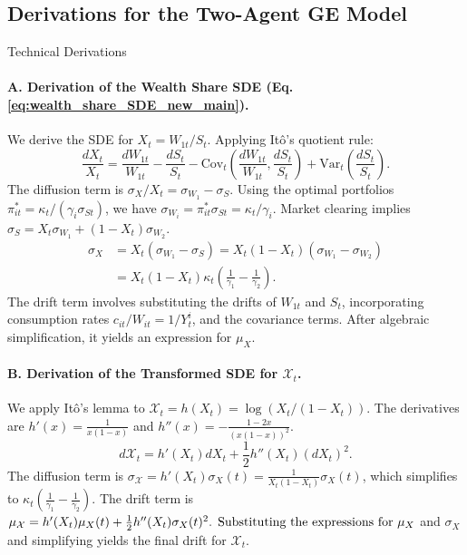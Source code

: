\subsection{Derivations for the Two-Agent GE Model}
\label{app:WealthShare}
\begin{leanproofbox}{Technical Derivations}
\paragraph{A. Derivation of the Wealth Share SDE (Eq. \ref{eq:wealth_share_SDE_new_main}).}
We derive the SDE for \(X_t = W_{1t}/S_t\). Applying Itô's quotient rule:
\begin{equation*}
\frac{dX_t}{X_t} = \frac{dW_{1t}}{W_{1t}} - \frac{dS_t}{S_t} - \text{Cov}_t\left(\frac{dW_{1t}}{W_{1t}}, \frac{dS_t}{S_t}\right) + \text{Var}_t\left(\frac{dS_t}{S_t}\right).
\end{equation*}
The diffusion term is \(\sigma_X/X_t = \sigma_{W_1} - \sigma_S\). Using the optimal portfolios \(\pi_{it}^* = \kappa_t/(\gamma_i \sigma_{St})\), we have \(\sigma_{W_i} = \pi_{it}^*\sigma_{St} = \kappa_t/\gamma_i\). Market clearing implies \(\sigma_S = X_t \sigma_{W_1} + (1-X_t)\sigma_{W_2}\).
\begin{align*}
\sigma_X &= X_t(\sigma_{W_1} - \sigma_S) = X_t(1-X_t)(\sigma_{W_1}-\sigma_{W_2}) \\
&= X_t(1-X_t)\kappa_t\left(\frac{1}{\gamma_1}-\frac{1}{\gamma_2}\right).
\end{align*}
The drift term involves substituting the drifts of \(W_{1t}\) and \(S_t\), incorporating consumption rates \(c_{it}/W_{it} = 1/Y^i_t\), and the covariance terms. After algebraic simplification, it yields an expression for $\mu_X$.

\paragraph{B. Derivation of the Transformed SDE for \(\mathcal{X}_t\).}
We apply Itô's lemma to \(\mathcal{X}_t = h(X_t) = \log(X_t/(1-X_t))\). The derivatives are \(h'(x) = \frac{1}{x(1-x)}\) and \(h''(x) = -\frac{1-2x}{(x(1-x))^2}\).
\begin{equation*}
d\mathcal{X}_t = h'(X_t) dX_t + \frac{1}{2} h''(X_t) (dX_t)^2.
\end{equation*}
The diffusion term is \(\sigma_{\mathcal{X}} = h'(X_t)\sigma_X(t) = \frac{1}{X_t(1-X_t)} \sigma_X(t)\), which simplifies to $\kappa_t(\frac{1}{\gamma_1}-\frac{1}{\gamma_2})$.
The drift term is \(\mu_{\mathcal{X}} = h'(X_t)\mu_X(t) + \frac{1}{2} h''(X_t)\sigma_X(t)^2$. Substituting the expressions for \(\mu_X\) and \(\sigma_X\) and simplifying yields the final drift for $\mathcal{X}_t$.
\end{leanproofbox}

